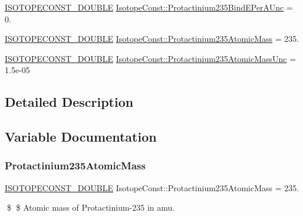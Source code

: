 \begin{DoxyCompactItemize}
\item 
\mbox{\hyperlink{group___isotope_const-_macros_ga8f45a7272ce02c0b4c65c44636ed719a}{I\+S\+O\+T\+O\+P\+E\+C\+O\+N\+S\+T\+\_\+\+D\+O\+U\+B\+LE}} \mbox{\hyperlink{group___isotope_const-_protactinium-_pa235_ga9e180110b9916504c4cc099ce9dbc247}{Isotope\+Const\+::\+Protactinium235\+Bind\+E\+Per\+A\+Unc}} = 0.
\item 
\mbox{\hyperlink{group___isotope_const-_macros_ga8f45a7272ce02c0b4c65c44636ed719a}{I\+S\+O\+T\+O\+P\+E\+C\+O\+N\+S\+T\+\_\+\+D\+O\+U\+B\+LE}} \mbox{\hyperlink{group___isotope_const-_protactinium-_pa235_gaeba6733357aee8847a6ca19b38d6d927}{Isotope\+Const\+::\+Protactinium235\+Atomic\+Mass}} = 235.
\item 
\mbox{\hyperlink{group___isotope_const-_macros_ga8f45a7272ce02c0b4c65c44636ed719a}{I\+S\+O\+T\+O\+P\+E\+C\+O\+N\+S\+T\+\_\+\+D\+O\+U\+B\+LE}} \mbox{\hyperlink{group___isotope_const-_protactinium-_pa235_ga607f1e1c98f2cc624fb3450893157698}{Isotope\+Const\+::\+Protactinium235\+Atomic\+Mass\+Unc}} = 1.\+5e-\/05
\end{DoxyCompactItemize}


\subsection{Detailed Description}


\subsection{Variable Documentation}
\mbox{\label{group___isotope_const-_protactinium-_pa235_gaeba6733357aee8847a6ca19b38d6d927}} 
\subsubsection{\texorpdfstring{Protactinium235\+Atomic\+Mass}{Protactinium235AtomicMass}}
{\footnotesize\ttfamily \mbox{\hyperlink{group___isotope_const-_macros_ga8f45a7272ce02c0b4c65c44636ed719a}{I\+S\+O\+T\+O\+P\+E\+C\+O\+N\+S\+T\+\_\+\+D\+O\+U\+B\+LE}} Isotope\+Const\+::\+Protactinium235\+Atomic\+Mass = 235.}

\$ \$ Atomic mass of Protactinium-\/235 in amu. \mbox{\label{group___isotope_const-_protactinium-_pa235_ga607f1e1c98f2cc624fb3450893157698}} 
